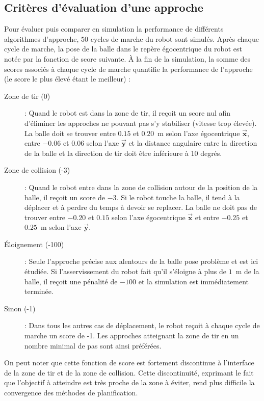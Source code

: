 \subsection{Critères d'évaluation d'une approche\label{sec:odometry_cmaes_fitness}}

Pour évaluer puis comparer en simulation 
la performance de différents algorithmes d'approche, 
$50$ cycles de marche du robot sont simulés.
Après chaque cycle de marche, la pose de la balle dans 
le repère égocentrique du robot est notée par la fonction
de score suivante.
À la fin de la simulation, la somme des scores associés
à chaque cycle de marche quantifie la performance de l'approche 
(le score le plus élevé étant le meilleur) :
\begin{description}
    \item[Zone de tir (0)] : 
        Quand le robot est dans la zone de tir, il reçoit un score nul
        afin d'éliminer les approches ne pouvant pas s'y stabiliser 
        (vitesse trop élevée). 
        La balle doit se trouver entre $0.15$ et $0.20$~m selon
        l'axe égocentrique $\vec{\bm{x}}$, entre $-0.06$ et $0.06$
        selon l'axe $\vec{\bm{y}}$ et la distance angulaire entre 
        la direction de la balle et la direction de tir doit 
        être inférieure à $10$ degrés.
    \item[Zone de collision (-3)] : 
        Quand le robot entre dans la zone de collision autour de
        la position de la balle, il reçoit un score de $-3$.
        Si le robot touche la balle, il tend à la déplacer 
        et à perdre du temps à devoir se replacer.
        La balle ne doit pas de trouver entre $-0.20$ et $0.15$
        selon l'axe égocentrique $\vec{\bm{x}}$ et 
        entre $-0.25$ et $0.25$~m selon l'axe $\vec{\bm{y}}$.
    \item[Éloignement (-100)] : 
        Seule l'approche précise aux alentours de la balle 
        pose problème et est ici étudiée.
        Si l'asservissement du robot fait qu'il s'éloigne à
        plus de $1$~m de la balle, il reçoit une pénalité de 
        $-100$ et la simulation est immédiatement terminée.
    \item[Sinon (-1)] :
        Dans tous les autres cas de déplacement, le robot
        reçoit à chaque cycle de marche un score de -1.
        Les approches atteignant la zone de tir en 
        un nombre minimal de pas sont ainsi préférées.
\end{description}
On peut noter que cette fonction de score est fortement discontinue 
à l'interface de la zone de tir et de la zone de collision.
Cette discontinuité, exprimant le fait que l'objectif à atteindre 
est très proche de la zone à éviter, rend plus difficile la 
convergence des méthodes de planification.

